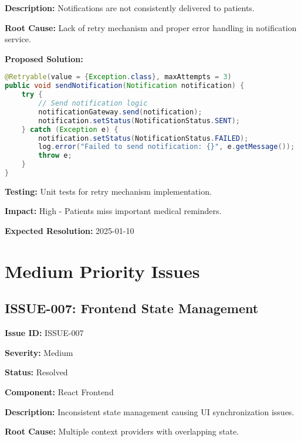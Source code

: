 \documentclass[12pt,a4paper]{article}
\begin{document}
\textbf{Description:} Notifications are not consistently delivered to patients.

\textbf{Root Cause:} Lack of retry mechanism and proper error handling in notification service.

\textbf{Proposed Solution:}
\begin{lstlisting}[language=Java, caption=Notification Retry Mechanism]
@Retryable(value = {Exception.class}, maxAttempts = 3)
public void sendNotification(Notification notification) {
    try {
        // Send notification logic
        notificationGateway.send(notification);
        notification.setStatus(NotificationStatus.SENT);
    } catch (Exception e) {
        notification.setStatus(NotificationStatus.FAILED);
        log.error("Failed to send notification: {}", e.getMessage());
        throw e;
    }
}
\end{lstlisting}

\textbf{Testing:} Unit tests for retry mechanism implementation.

\textbf{Impact:} High - Patients miss important medical reminders.

\textbf{Expected Resolution:} 2025-01-10

\section{Medium Priority Issues}

\subsection{ISSUE-007: Frontend State Management}

\textbf{Issue ID:} ISSUE-007

\textbf{Severity:} Medium

\textbf{Status:} Resolved

\textbf{Component:} React Frontend

\textbf{Description:} Inconsistent state management causing UI synchronization issues.

\textbf{Root Cause:} Multiple context providers with overlapping state.
\end{document}
